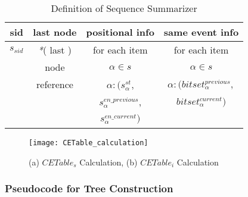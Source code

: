 \begin{table}[!tb]
\centering
\begin{tabular}{|c|c|c|c|}
\hline
sid & last node& positional info & same event info\\
\hline
$s_{sid}$ & \textit{*}( last ) & for each item  & for each item \\
& node & $\alpha \in s$ & $\alpha \in s$ \\ 
& reference & $\alpha:(s_{\alpha}^{st}$, &  $\alpha:(bitset_{\alpha}^{previous},$\\
& & $s_{\alpha}^{en\_previous}$, & $bitset_{\alpha}^{current})$\\\ 
& &$s_{\alpha}^{en\_current})$& \\
\hline
\end{tabular}
\caption{Definition of Sequence Summarizer}
\label{table:sequence_summarizer_structure}
\end{table}

\begin{figure}[!t]
\centering
\texttt{[image: CETable\_calculation]}
\caption{(a) $CETable_{s}$ Calculation, (b) $CETable_{i}$ Calculation} \label{figure:cetable_calculation}
\end{figure}

\subsubsection{Pseudocode for Tree Construction}

